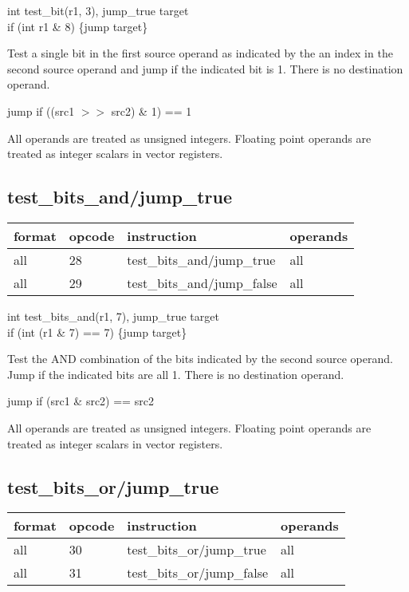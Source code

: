 \documentclass[forwardcom.tex]{subfiles}
\begin{document}
int test\_bit(r1, 3), jump\_true target \\
if (int r1 \& 8) \{jump target\}
\vv

Test a single bit in the first source operand as indicated by the an index in the second source operand and jump if the indicated bit is 1. There is no destination operand.
\vv

jump if ((src1 $>>$ src2) \& 1) == 1
\vv

All operands are treated as unsigned integers. 
Floating point operands are treated as integer scalars in vector registers.
\vv


\subsection{test\_bits\_and/jump\_true}
\label{table:testBitsAndJumpInstruction}
\begin{tabular}{|p{16mm}|p{12mm}|p{60mm}|p{50mm}|}
\hline
\bfseries format & \bfseries opcode & \bfseries instruction & \bfseries operands \\ \hline
all & 28 & test\_bits\_and/jump\_true & all \\ \hline
all & 29 & test\_bits\_and/jump\_false & all \\ \hline
\end{tabular}
\vv

int test\_bits\_and(r1, 7), jump\_true target \\
if (int (r1 \& 7) == 7) \{jump target\}
\vv

Test the AND combination of the bits indicated by the second source operand. Jump if the indicated bits are all 1. There is no destination operand.
\vv

jump if (src1 \& src2) == src2
\vv

All operands are treated as unsigned integers. 
Floating point operands are treated as integer scalars in vector registers.
\vv


\subsection{test\_bits\_or/jump\_true}
\label{table:testBitsOrJumpInstruction}
\begin{tabular}{|p{16mm}|p{12mm}|p{60mm}|p{50mm}|}
\hline
\bfseries format & \bfseries opcode & \bfseries instruction & \bfseries operands \\ \hline
all & 30 & test\_bits\_or/jump\_true & all \\ \hline
all & 31 & test\_bits\_or/jump\_false & all \\ \hline
\end{tabular}
\vv
\end{document}
